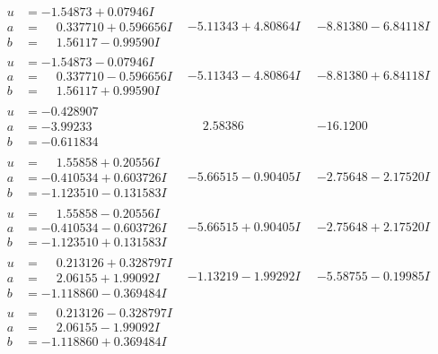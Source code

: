\documentclass[1p]{elsarticle_modified}
\theoremstyle{definition}
\begin{document}
$$\begin{array}{c|c|c}
\begin{aligned}
u &= -1.54873 + 0.07946 I \\
a &= \phantom{-}0.337710 + 0.596656 I \\
b &= \phantom{-}1.56117 - 0.99590 I\end{aligned}
 & -5.11343 + 4.80864 I & -8.81380 - 6.84118 I \\ \hline\begin{aligned}
u &= -1.54873 - 0.07946 I \\
a &= \phantom{-}0.337710 - 0.596656 I \\
b &= \phantom{-}1.56117 + 0.99590 I\end{aligned}
 & -5.11343 - 4.80864 I & -8.81380 + 6.84118 I \\ \hline\begin{aligned}
u &= -0.428907\phantom{ +0.000000I} \\
a &= -3.99233\phantom{ +0.000000I} \\
b &= -0.611834\phantom{ +0.000000I}\end{aligned}
 & \phantom{-}2.58386\phantom{ +0.000000I} & -16.1200\phantom{ +0.000000I} \\ \hline\begin{aligned}
u &= \phantom{-}1.55858 + 0.20556 I \\
a &= -0.410534 + 0.603726 I \\
b &= -1.123510 - 0.131583 I\end{aligned}
 & -5.66515 - 0.90405 I & -2.75648 - 2.17520 I \\ \hline\begin{aligned}
u &= \phantom{-}1.55858 - 0.20556 I \\
a &= -0.410534 - 0.603726 I \\
b &= -1.123510 + 0.131583 I\end{aligned}
 & -5.66515 + 0.90405 I & -2.75648 + 2.17520 I \\ \hline\begin{aligned}
u &= \phantom{-}0.213126 + 0.328797 I \\
a &= \phantom{-}2.06155 + 1.99092 I \\
b &= -1.118860 - 0.369484 I\end{aligned}
 & -1.13219 - 1.99292 I & -5.58755 - 0.19985 I \\ \hline\begin{aligned}
u &= \phantom{-}0.213126 - 0.328797 I \\
a &= \phantom{-}2.06155 - 1.99092 I \\
b &= -1.118860 + 0.369484 I\end{aligned}

\end{array}$$
\end{document}
